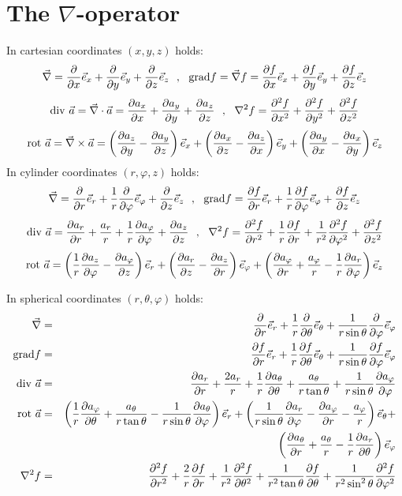 \newpage
{}

\section*{The $\nabla$-operator}
In cartesian coordinates $(x,y,z)$ holds:
\[
\vec{\nabla}=\Q{}{x}\ee{x}+\Q{}{y}\ee{y}+\Q{}{z}\ee{z}~~,~~
{\rm grad}f=\vec{\nabla}f=\Q{f}{x}\ee{x}+\Q{f}{y}\ee{y}+\Q{f}{z}\ee{z}
\]
\[
{\rm div}~\aaa=\vec{\nabla}\cdot\aaa=\Q{a_x}{x}+\Q{a_y}{y}+\Q{a_z}{z}~~,~~
\nabla^2 f=\QQ{f}{x}+\QQ{f}{y}+\QQ{f}{z}
\]
\[
{\rm rot}~\aaa=\vec{\nabla}\times\aaa=
               \left(\Q{a_z}{y}-\Q{a_y}{z}\right)\ee{x}+
               \left(\Q{a_x}{z}-\Q{a_z}{x}\right)\ee{y}+
               \left(\Q{a_y}{x}-\Q{a_x}{y}\right)\ee{z}
\]
In cylinder coordinates $(r,\varphi,z)$ holds:
\[
\vec{\nabla}=\Q{}{r}\ee{r}+\frac{1}{r}\Q{}{\varphi}\ee{\varphi}+\Q{}{z}\ee{z}~~,~~
{\rm grad}f=\Q{f}{r}\ee{r}+\frac{1}{r}\Q{f}{\varphi}\ee{\varphi}+\Q{f}{z}\ee{z}
\]
\[
{\rm div}~\aaa=\Q{a_r}{r}+\frac{a_r}{r}+\frac{1}{r}\Q{a_\varphi}{\varphi}+\Q{a_z}{z}~~,~~
\nabla^2 f=\QQ{f}{r}+\frac{1}{r}\Q{f}{r}+\frac{1}{r^2}\QQ{f}{\varphi}+\QQ{f}{z}
\]
\[
{\rm rot}~\aaa=\left(\frac{1}{r}\Q{a_z}{\varphi}-\Q{a_\varphi}{z}\right)\ee{r}+
               \left(\Q{a_r}{z}-\Q{a_z}{r}\right)\ee{\varphi}+
               \left(\Q{a_\varphi}{r}+\frac{a_\varphi}{r}-\frac{1}{r}\Q{a_r}{\varphi}\right)\ee{z}\\
\]

In spherical coordinates $(r,\theta,\varphi)$ holds:
\begin{eqnarray*}
\vec{\nabla}  &=&\Q{}{r}\ee{r}+\frac{1}{r}\Q{}{\theta}\ee{\theta}+\frac{1}{r\sin\theta}\Q{}{\varphi}\ee{\varphi}\\
{\rm grad}f   &=&\Q{f}{r}\ee{r}+\frac{1}{r}\Q{f}{\theta}\ee{\theta}+\frac{1}{r\sin\theta}\Q{f}{\varphi}\ee{\varphi}\\
{\rm div}~\aaa&=&\Q{a_r}{r}+\frac{2a_r}{r}+\frac{1}{r}\Q{a_\theta}{\theta}+\frac{a_\theta}{r\tan\theta}+\frac{1}{r\sin\theta}\Q{a_\varphi}{\varphi}\\
{\rm rot}~\aaa&=&\left(\frac{1}{r}\Q{a_\varphi}{\theta}+\frac{a_\theta}{r\tan\theta}-\frac{1}{r\sin\theta}\Q{a_\theta}{\varphi}\right)\ee{r}+
                 \left(\frac{1}{r\sin\theta}\Q{a_r}{\varphi}-\Q{a_\varphi}{r}-\frac{a_\varphi}{r}\right)\ee{\theta}+\\
              &&\left(\Q{a_\theta}{r}+\frac{a_\theta}{r}-\frac{1}{r}\Q{a_r}{\theta}\right)\ee{\varphi}\\
\nabla^2 f    &=&\QQ{f}{r}+\frac{2}{r}\Q{f}{r}+\frac{1}{r^2}\QQ{f}{\theta}+\frac{1}{r^2\tan\theta}\Q{f}{\theta}+\frac{1}{r^2\sin^2\theta}\QQ{f}{\varphi}
\end{eqnarray*}

